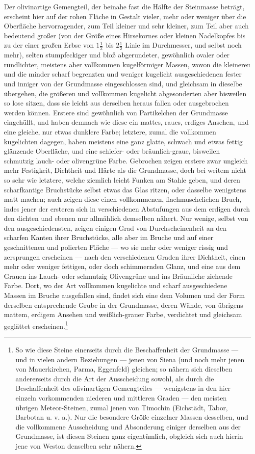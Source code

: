 \documentclass[a4paper, 11pt, oneside, german]{article}
\begin{document}
Der olivinartige Gemengteil, der beinahe fast die Hälfte der Steinmasse beträgt, erscheint hier auf der rohen Fläche in Gestalt vieler, mehr oder weniger über die Oberfläche hervorragender, zum Teil kleiner und sehr kleiner, zum Teil aber auch bedeutend großer (von der Größe eines Hirsekornes oder kleinen Nadelkopfes bis zu der einer großen Erbse von $1\frac{1}{2}$ bis $2\frac{1}{2}$ Linie im Durchmesser, und selbst noch mehr), selten stumpfeckiger und bloß abgerundeter, gewöhnlich ovaler oder rundlichter, meistens aber vollkommen kugelförmiger Massen, wovon die kleineren und die minder scharf begrenzten und weniger kugelicht ausgeschiedenen fester und inniger von der Grundmasse eingeschlossen sind, und gleichsam in dieselbe übergehen, die größeren und vollkommen kugelicht abgesonderten aber bisweilen so lose sitzen, dass sie leicht aus derselben heraus fallen oder ausgebrochen werden können. Erstere sind gewöhnlich von Partikelchen der Grundmasse eingehüllt, und haben demnach wie diese ein mattes, raues, erdiges Ansehen, und eine gleiche, nur etwas dunklere Farbe; letztere, zumal die vollkommen kugelichten dagegen, haben meistens eine ganz glatte, schwach und etwas fettig glänzende Oberfläche, und eine schiefer- oder bräunlich-graue, bisweilen schmutzig lauch- oder olivengrüne Farbe. Gebrochen zeigen erstere zwar ungleich mehr Festigkeit, Dichtheit und Härte als die Grundmasse, doch bei weitem nicht so sehr wie letztere, welche ziemlich leicht Funken am Stahle geben, und deren scharfkantige Bruchstücke selbst etwas das Glas ritzen, oder dasselbe wenigstens matt machen; auch zeigen diese einen vollkommenen, flachmuschelichen Bruch, indes jener der ersteren sich in verschiedenen Abstufungen aus dem erdigen durch den dichten und ebenen nur allmählich demselben nähert. Nur wenige, selbst von den ausgeschiedensten, zeigen einigen Grad von Durchscheinenheit an den scharfen Kanten ihrer Bruchstücke, alle aber im Bruche und auf einer geschnittenen und polierten Fläche --- wo sie mehr oder weniger rissig und zersprungen erscheinen --- nach den verschiedenen Graden ihrer Dichtheit, einen mehr oder weniger fettigen, oder doch schimmernden Glanz, und eine aus dem Grauen ins Lauch- oder schmutzig Olivengrüne und ins Bräunliche ziehende Farbe. Dort, wo der Art vollkommen kugelichte und scharf ausgeschiedene Massen im Bruche ausgefallen sind, findet sich eine dem Volumen und der Form derselben entsprechende Grube in der Grundmasse, deren Wände, von übrigens mattem, erdigem Ansehen und weißlich-grauer Farbe, verdichtet und gleichsam geglättet erscheinen.\footnote{So wie diese Steine einerseits durch die Beschaffenheit der Grundmasse --- und in vielen andern Beziehungen --- jenen von Siena (und noch mehr jenen von Mauerkirchen, Parma, Eggenfeld) gleichen; so nähern sich dieselben andererseits durch die Art der Ausscheidung sowohl, als durch die Beschaffenheit des olivinartigen Gemengteiles --- wenigstens in den hier einzeln vorkommenden niederen und mittleren Graden --- den meisten übrigen Meteor-Steinen, zumal jenen von Timochin (Eichstädt, Tabor, Barbotan u. v. a.). Nur die besondere Größe einzelner Massen desselben, und die vollkommene Ausscheidung und Absonderung einiger derselben aus der Grundmasse, ist diesen Steinen ganz eigentümlich, obgleich sich auch hierin jene von Weston denselben sehr nähern.}
\end{document}
